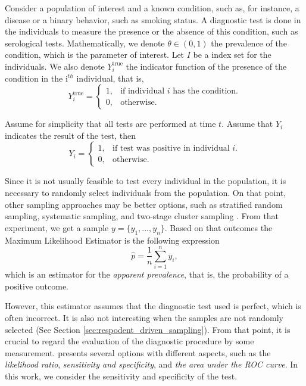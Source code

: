 Consider a population of interest and a known condition, such as, for instance,
a disease or a binary behavior, such as smoking status. A diagnostic test is done in the individuals
to measure the presence or the absence of this condition, such as serological
tests. Mathematically, we denote $\theta \in (0,1)$ the prevalence of the
condition, which is the parameter of interest. Let $I$ be a index set for the
individuals. We also denote $Y^{\mathrm{true}}_i$ the indicator function of
the presence of the condition in the i$^{th}$ individual, that is, 
$$Y^{\mathrm{true}}_i = \begin{cases}
  1, &\text{if individual } i \text{ has the condition.} \\
  0, &\text{otherwise.}
\end{cases}$$

Assume for simplicity that all tests are performed at time $t$. Assume that
$Y_i$ indicates the result of the test, then 
$$Y_i = \begin{cases}
  1, &\text{if test was positive in individual } i. \\
  0, &\text{otherwise.}
\end{cases}$$

Since it is not usually feasible to test every individual in the population, it is
necessary to randomly select individuals from the population. On that point,
other sampling approaches may be better options, such as stratified random
sampling, systematic sampling, and two-stage cluster sampling \cite[p. 125]{daniel2011sampling}. From that
experiment, we get a sample $y = \{y_1, ..., y_n\}$. Based on that outcomes the Maximum Likelihood Estimator is the following expression 
\begin{equation}
    \label{eq:naive-estimator}
    \hat{p} = \frac{1}{n}\sum_{i=1}^n y_i, 
\end{equation}
which is an estimator for the {\em apparent prevalence}, that is, the
probability of a positive outcome. 

However, this estimator assumes that the diagnostic test used is perfect,
which is often incorrect. It is also not
interesting when the samples are not randomly selected (See Section
\ref{sec:respodent_driven_sampling}). From that point, it is crucial to regard
the evaluation of the diagnostic procedure by some measurement. \textcite[p.
2]{vsimundic2009measures} presents several options with different aspects,
such as the {\em likelihood ratio}, {\em sensitivity and specificity}, and
{\em the area under the ROC curve}. In this work, we consider the sensitivity
and specificity of the test.

